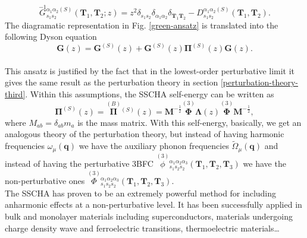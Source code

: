 \begin{equation}
 \overset{-1}{G}{}_{s_{1}s_{2}}^{\alpha_{1}\alpha_{2}(S)}(\mathbf{T}_{1},\mathbf{T}_{2};z)=z^{2}\delta_{s_{1}s_{2}}\delta_{\alpha_{1}\alpha_{2}}\delta_{\mathbf{T}_{1}\mathbf{T}_{2}}-D_{s_{1}s_{2}}^{\alpha_{1}\alpha_{2}(S)}(\mathbf{
 T}_{1},\mathbf{T}_{2}).
\end{equation}
The diagramatic representation in Fig. \ref{green-ansatz} is translated into the following Dyson equation
\begin{equation}
 \mathbf{G}(z)=\mathbf{G}^{(S)}(z)+\mathbf{G}^{(S)}(z)\boldsymbol{\Pi}^{(S)}(z)\mathbf{G}(z).
\end{equation}
\\

This ansatz is justified by the fact that in the lowest-order perturbative limit it gives the same result 
as the perturbation theory in section \ref{perturbation-theory-third}. Within this assumptions, the SSCHA self-energy can be written as\cite{bianco2017second}
\begin{equation}
 \boldsymbol{\Pi}^{(S)}(z)=\overset{(B)}{\boldsymbol{\Pi}}{}^{(S)}(z)=\boldsymbol{M}^{-\frac{1}{2}}\overset{(3)}{\boldsymbol{\Phi}}\boldsymbol{\Lambda}(z)\overset{(3)}{\boldsymbol{\Phi}}\boldsymbol{M}^{-\frac{1}{2}},
\end{equation} 
where $M_{ab}=\delta_{ab}m_{a}$ is the mass matrix. With this self-energy, basically, we get an analogous theory of the perturbation theory, but instead of having harmonic frequencies $\omega_{\mu}(\mathbf{q})$ we 
have the auxiliary phonon frequencies $\tilde{\Omega}_{\mu}(\mathbf{q})$ and instead of having the perturbative 3BFC $\overset{(3)}{\phi}{}_{s_{1}s_{2}s_{2}}^{\alpha_{1}\alpha_{2}\alpha_{3}}(\mathbf{T}_{1},\mathbf{
 T}_{2},\mathbf{T}_{3})$ we have the non-perturbative ones $\overset{(3)}{\Phi}{}_{s_{1}s_{2}s_{2}}^{\alpha_{1}\alpha_{2}\alpha_{3}}(\mathbf{T}_{1},\mathbf{T}_{2},\mathbf{T}_{3})$.  \\

The SSCHA has proven to be an extremely powerful method for including anharmonic effects at a non-perturbative level. It has been successfully applied in bulk and monolayer materials including 
superconductors\cite{errea2013first,errea2016quantum}, materials undergoing charge density wave\cite{leroux2015strong,bianco2019quantum} and ferroelectric\cite{ribeiro2018strong} transitions, thermoelectric 
materials\cite{aseginolaza2019phonon}\dots
